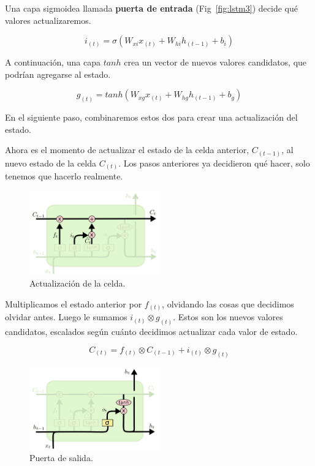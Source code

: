 \documentclass[a4paper,12pt]{article}
\begin{document}
Una capa sigmoidea llamada \textbf{puerta de entrada} (Fig~\ref{fig:lstm3}) decide qué valores actualizaremos.

$$i_{(t)}=\sigma(W_{xi}x_{(t)} + W_{hi}h_{(t-1)} + b_i)$$

A continuación, una capa $tanh$ crea un vector de nuevos valores candidatos, que podrían agregarse al estado. 

$$g_{(t)}=tanh(W_{xg}x_{(t)}+W_{hg}h_{(t-1)}+b_g)$$


En el siguiente paso, combinaremos estos dos para crear una actualización del estado.

Ahora es el momento de actualizar el estado de la celda anterior, $C_{(t-1)}$, al nuevo estado de la celda $C_{(t)}$. Los pasos anteriores ya decidieron qué hacer, solo tenemos que hacerlo realmente.

\begin{figure}[H]
	\begin{center}				
		\includegraphics[width=0.5\textwidth]{lstm4.png}
		\caption{Actualización de la celda. \citep{olahlstm}}
		\label{fig:lstm4}
	\end{center}
\end{figure}

Multiplicamos el estado anterior por $f_{(t)}$, olvidando las cosas que decidimos olvidar antes. Luego le sumamos $i_{(t)} \otimes g_{(t)}$. Estos son los nuevos valores candidatos, escalados según cuánto decidimos actualizar cada valor de estado.

$$C_{(t)} = f_{(t)} \otimes C_{(t-1)} + i_{(t)} \otimes g_{(t)}$$

\begin{figure}[H]
	\begin{center}				
		\includegraphics[width=0.5\textwidth]{lstm5.png}
		\caption{Puerta de salida. \citep{olahlstm}}
		\label{fig:lstm5}
	\end{center}
\end{figure}
\end{document}
